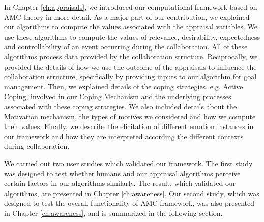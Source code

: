 \documentclass[12pt]{report}
\begin{document}
In Chapter \ref{ch:appraisals}, we introduced our computational framework based
on AMC theory in more detail. As a major part of our contribution, we explained
our algorithms to compute the values associated with the appraisal variables.
We use these algorithms to compute the values of relevance, desirability,
expectedness and controllability of an event occurring during the collaboration.
All of these algorithms process data provided by the collaboration structure.
Reciprocally, we provided the details of how we use the outcome of the
appraisals to influence the collaboration structure, specifically by providing
inputs to our algorithm for goal management. Then, we explained details of the
coping strategies, e.g. Active Coping, involved in our Coping Mechanism and the
underlying processes associated with these coping strategies. We also included
details about the Motivation mechanism, the types of motives we considered and
how we compute their values. Finally, we describe the elicitation of different
emotion instances in our framework and how they are interpreted according the
different contexts during collaboration.

We carried out two user studies which validated our framework. The first study
was designed to test whether humans and our appraisal algorithms perceive
certain factors in our algorithms similarly. The result, which validated our
algorithms, are presented in Chapter \ref{ch:awareness}. Our second study, which
was designed to test the overall functionality of AMC framework, was also
presented in Chapter \ref{ch:awareness}, and is summarized in the following
section.

\end{document}
